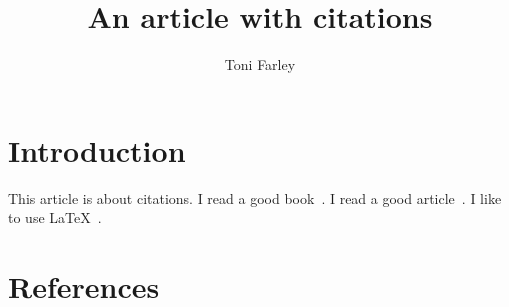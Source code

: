 \documentclass{article}
\title{An article with citations}
\author{Toni Farley}
\date{}
\begin{document}
\maketitle

\section{Introduction}

This article is about citations. I read a good book~\cite{smith2012}. I read a good article~\cite{hall2013}. I like to use \LaTeX~\cite{latex}.

\section{References}



\end{document}
